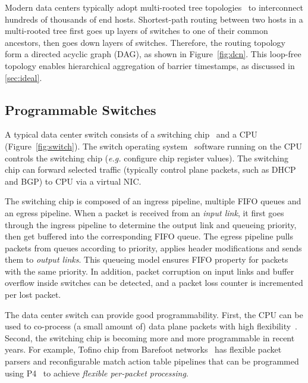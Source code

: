 Modern data centers typically adopt multi-rooted tree topologies~\cite{leiserson1985fat,greenberg2009vl2} to interconnect hundreds of thousands of end hosts.
Shortest-path routing between two hosts in a multi-rooted tree first goes up layers of switches to one of their common ancestors, then goes down layers of switches.
Therefore, the routing topology form a directed acyclic graph (DAG), as shown in Figure~\ref{fig:dcn}.
This loop-free topology enables hierarchical aggregation of barrier timestamps, as discussed in \ref{sec:ideal}.


\subsection{Programmable Switches}
\label{sec:programmable-switches}


A typical data center switch consists of a switching chip~\cite{broadcom} and a CPU (Figure~\ref{fig:switch}).
The switch operating system~\cite{arista-eos} software running on the CPU controls the switching chip (\textit{e.g.} configure chip register values).
The switching chip can forward selected traffic (typically control plane packets, such as DHCP and BGP) to CPU via a virtual NIC.

The switching chip is composed of an ingress pipeline, multiple FIFO queues and an egress pipeline.
When a packet is received from an \textit{input link}, it first goes through the ingress pipeline to determine the output link and queueing priority, then get buffered into the corresponding FIFO queue.
The egress pipeline pulls packets from queues according to priority, applies header modifications and sends them to \textit{output links}.
This queueing model ensures FIFO property for packets with the same priority.
In addition, packet corruption on input links and buffer overflow inside switches can be detected, and a packet loss counter is incremented per lost packet.

The data center switch can provide good programmability.
First, the CPU can be used to co-process (a small amount of) data plane packets with high flexibility~\cite{lu2011serverswitch}.
Second, the switching chip is becoming more and more programmable in recent years.
For example, Tofino chip from Barefoot networks~\cite{tofino} 
has flexible packet parsers and reconfigurable match action table pipelines that can be programmed using P4~\cite{bosshart2014p4} to achieve \textit{flexible per-packet processing}.

